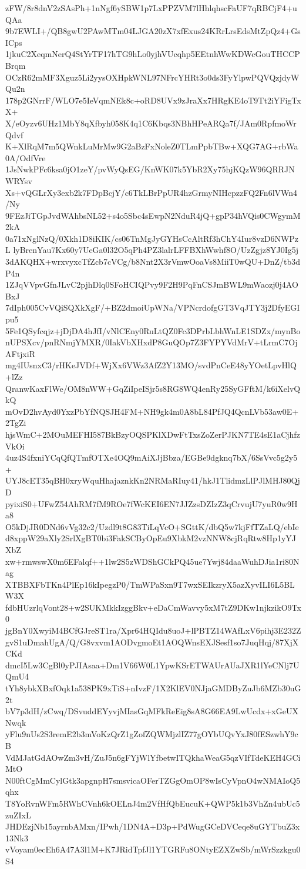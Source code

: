 zFW/8r8dnV2zSAsPh+1nNgf6ySBW1p7LxPPZVM7lHhlqhscFaUF7qRBCjF4+uQAa
9b7EWLI+/QB8gwU2PAwMTm04LJGA20zX7xfExus24KRrLrsEdsMtZpQz4+GsICps
1jkuC2XeqmNerQ4StYrTF17hTG9hLo0yjhVUcqhp5EEtnhWwKDWcGouTHCCPBrqm
OCzR62mMF3Xguz5Li2yysOXHpkWNL97NFrcYHRt3o0ds3FyYlpwPQVQzjdyWQu2n
178p2GNrrF/WLO7e5IeVqmNEk8c+oRD8UVx9zJraXx7HRgKE4oT9Tt2iYFigTxX+
X/eOyzv6UHz1MbY8qXfbyh058K4q1C6Kbqs3NBhHPeARQa7f/JAm0RpfmoWrQdvf
K+XlRqM7m5QWnkLuMrMw9G2aBzFxNoleZ0TLmPpbTBw+XQG7AG+rbWa0A/OdfVre
1JsNwkPFc6ksa0jO1zeY/pvWyQsEG/KnWK07k5YbR2Xy75hjKQzW96QRRJNWRYsv
Xs+vQGLrXy3exb2k7FDpBcjY/c6TkLBrPpUR4hzGrmyNIHcpzzFQ2Fn6lVWn4/Ny
9FEzJiTGpJvdWAhbsNL52+s4o5Sbc4sEwpN2NduR4jQ+gpP34hVQis0CWgymM2kA
0a71xNglNzQ/0Xkh1D8iKIK/cs06TnMgJyGYHsCcAltRf3hChY4Iur8vzD6NWPzL
lyBrenYau7Kx60y7UeGa0l32O5qPh4PZ3lalrLFFBXhWwhf8O/UzZgjz8YJ0Ig5j
3dAKQHX+wrxvyxcTfZcb7cVCg/b8Nnt2X3rVmwOoaVs8MiiT0wQU+DnZ/tb3dP4n
1ZJqVVpvGfnJLvC2pjhDlq0SFoHCIQPvy9F2H9PqFnCSJmBWL9mWaozj0j4AOBxJ
7dIph005CvVQiSQXkXgF/+BZ2dmoiUpWNa/VPNcrdofgGT3VqJTY3j2DfyEGIpu5
5Fe1QSyfcqjz+jDjDA4hJfI/vNlCEny0RuLtQZ0Fc3DPrbLbhWnLE1SDZx/mynBo
nUPSXcv/pnRNmjYMXR/0IakVbXHxdP8GuQOp7Z3FYPYVdMrV+tLrmC7OjAFtjxiR
mg4IUsnxC3/rHKeJVDf+WjXx6VWz3AfZ2Y13MO/svdPnCeE48yYOetLpvHlQ+lZz
QranwKaxFlWe/OM8nWW+GqZiIpeISjr5s8RG8WQ4enRy25SyGFftM/k6iXelvQkQ
mOvD2hvAyd0YxzPbYfNQSJH4FM+NH9gk4m0A8bL84PfJQ4QcnLVb53aw0E+2TgZi
hjsWmC+2MOuMEFHI587BkBzyOQSPKlXDwFtTxsZoZerPJKN7TE4sE1aCjhfzVkOi
4uz4S4fxniYCqQfQTmfOTXe4OQ9mAiXJjBbza/EGBe9dgknq7bX/6SsVvc5g2y5+
UYJ8cET35qBH0xryWquHhajaznkKn2NRMaRIuy41/hkJ1TlidmzLlPJlMHJ80QjD
pyixiS0+UFwZ54AhRM7fM9ROe7fWcKEI6EN7JJZzsDZIzZ3qCrvujU7yuR0w9Ha8
O5kDjJR0DNd6vVg32c2/Uzdl9t8G83TiLqVcO+SGttK/dbQ5w7kjFfTZaLQ/ebIe
d8xppW29aXly2SrlXgBT0bi3FakSCByOpEu9XbkM2vzNNW8cjRqRtw8Hp1yYJXbZ
xw+rmwswX0m6EFalqf++1lw2S5zWDShGCkPQ45ue7Ywj84daaWuhDJia1ri80Nag
XTBBXFbTKn4PlEp16kIpegzP0/TmWPaSxn9T7wxSEIkzryX5azXyvILI6L5BLW3X
fdbHUzrlqVont28+w2SUKMkkIzggBkv+eDaCmWavvy5xM7tZ9DKw1njkzikO9Tx0
jgBnY0XwyiM4BCfGJreST1ra/Xpr64HQIdu8uoJ+lPBTZ14WAfLxV6pihj3E232Z
gvS1uDmahUgA/Q/G8vxvm1AODvgmoEt1AOQWnsEXJSesf1so7JuqHqj/87XjXCKd
dmcI5Lw3CgBl0yPJIAsaa+Dm1V66W0L1YpwKSrETWAUrAUaJXR1lYeCNlj7UQmU4
tYh8ybkXBxfOqk1a538PK9xTiS+nIvzF/1X2KlEV0NJjaGMDByZuJb6MZb30uG2t
bV7p3dH/zCwq/DSvuddEYyvjMIasGqMFkReEig8sA8G66EA9LwUcdx+xGeUXNwqk
yFlu9nUs2S3remE2b3mVoKzQrZ1gZofZQWMjzlIZ77gOYbUQvYxJ80fESzwhY9cB
VdMJatGdAOwZm3vH/ZuJ5n6gFYjWlYfbetwITQkhaWeaG5qzVIfTdeKEH4GCiMtO
N00ftCgMmCylGtk3apgnpH7smsvicaOFerTZGgOmOP8wIsCyVpnO4wNMAIoQ5qhx
T8YoRvnWFm5RWhCVnh6kOELnJ4m2VfHfQbEucuK+QWP5k1b3VhZn4ubUc5zuZIxL
JHDEzjNb15ayrnbAMxn/IPwh/1DN4A+D3p+PdWugGCeDVCeqe8uGYTbuZ3x13Nk3
vVoyam0ecEh6A47A3l1M+K7JRidTpfJl1YTGRFu8ONtyEZXZwSb/mWrSzzkgu0S4
